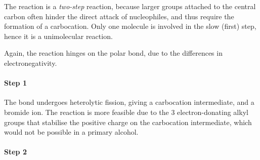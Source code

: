 				The \snone reaction is a \textit{two-step} reaction, because larger groups attached to the central carbon
				often hinder the direct attack of nucleophiles, and thus require the formation of a carbocation. Only one molecule
				is involved in the slow (first) step, hence it is a unimolecular reaction.

				Again, the reaction hinges on the polar  bond, due to the differences in electronegativity.

				\paragraph{Step 1}


				The  bond undergoes heterolytic fission, giving a carbocation intermediate, and a bromide ion. The reaction is more
				feasible due to the 3 electron-donating alkyl groups that stabilise the positive charge on the carbocation intermediate, which
				would not be possible in a primary alcohol.

				\paragraph{Step 2}


